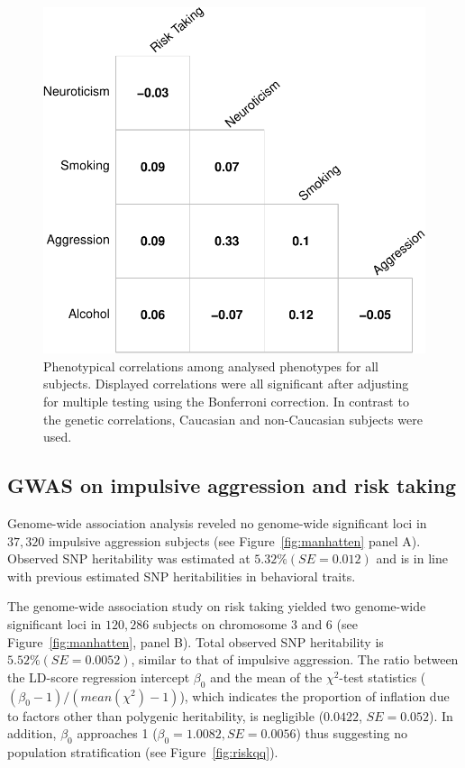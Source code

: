 \begin{figure}[htpb]
  \centering
  \includegraphics[width=0.6\linewidth]{ukb_assoc/figure/phenotype/corr_plot_ci.pdf} 
  \caption{
    Phenotypical correlations among analysed phenotypes for all subjects.
    Displayed correlations were all significant after adjusting for multiple testing using the Bonferroni correction.
    In contrast to the genetic correlations, Caucasian and non-Caucasian subjects were used.
  }\label{fig:corr_pheno}
\end{figure}

\subsection{GWAS on impulsive aggression and risk taking}
\label{sub:gwas}

Genome-wide association analysis reveled no genome-wide significant loci in $37,320$ impulsive aggression subjects (see Figure~\ref{fig:manhatten} panel A).
Observed SNP heritability was estimated at $5.32\% (SE=0.012)$ and is in line with previous estimated SNP heritabilities in behavioral traits.

The genome-wide association study on risk taking yielded two genome-wide significant loci in $120,286$ subjects on chromosome 3 and 6 (see Figure~\ref{fig:manhatten}, panel B).
Total observed SNP heritability is  $5.52\% (SE=0.0052)$, similar to that of impulsive aggression.
The ratio between the LD-score regression intercept $\beta_0$ and the mean of the $\chi^2$-test statistics ($(\beta_0 - 1)/(mean(\chi^2)-1)$),
which indicates the proportion of inflation due to factors other than polygenic heritability, is  negligible ($0.0422$, $SE=0.052$).
In addition, $\beta_0$ approaches 1 ($\beta_0=1.0082, SE=0.0056$) thus suggesting no population stratification (see Figure~\ref{fig:riskqq}).

